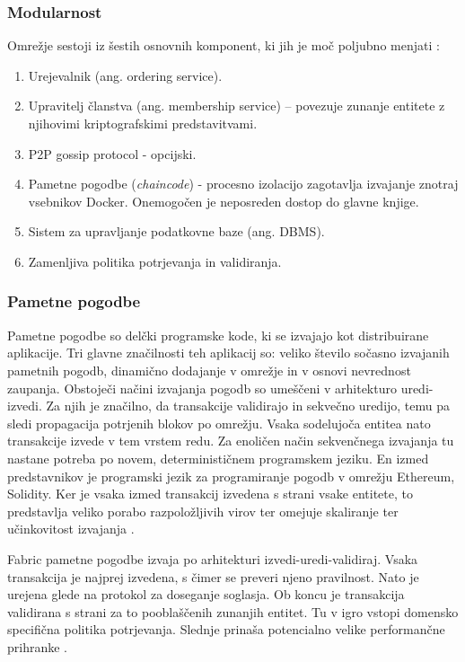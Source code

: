 \documentclass[a4paper, 12pt]{book}
\begin{document}
\subsubsection{Modularnost}
Omrežje sestoji iz šestih osnovnih komponent, ki jih je moč poljubno menjati \cite{hyperledgerDocs}:
\begin{enumerate}
	\item Urejevalnik (ang. ordering service).
	\item Upravitelj članstva (ang. membership service) -- povezuje zunanje entitete z njihovimi kriptografskimi predstavitvami.
	\item P2P gossip protocol - opcijski.
	\item Pametne pogodbe (\textit{chaincode}) - procesno izolacijo zagotavlja izvajanje znotraj vsebnikov Docker. 
	Onemogočen je neposreden dostop do glavne knjige.
	\item Sistem za upravljanje podatkovne baze (ang. DBMS).
	\item Zamenljiva politika potrjevanja in validiranja.
\end{enumerate}

\subsubsection{Pametne pogodbe}
Pametne pogodbe so delčki programske kode, ki se izvajajo kot distribuirane aplikacije.
Tri glavne značilnosti teh aplikacij so: veliko število sočasno izvajanih pametnih pogodb, dinamično dodajanje v omrežje in v osnovi nevrednost zaupanja.
Obstoječi načini izvajanja pogodb so umeščeni v arhitekturo uredi-izvedi.
Za njih je značilno, da transakcije validirajo in sekvečno uredijo, temu pa sledi propagacija potrjenih blokov po omrežju.
Vsaka sodelujoča entitea nato transakcije izvede v tem vrstem redu.
Za enoličen način sekvenčnega izvajanja tu nastane potreba po novem, determinističnem programskem jeziku.
En izmed predstavnikov je programski jezik za programiranje pogodb v omrežju Ethereum, Solidity.
Ker je vsaka izmed transakcij izvedena s strani vsake entitete, to predstavlja veliko porabo razpoložljivih virov ter omejuje skaliranje ter učinkovitost izvajanja \cite{hyperledgerDocs}.

Fabric pametne pogodbe izvaja po arhitekturi izvedi-uredi-validiraj.
Vsaka transakcija je najprej izvedena, s čimer se preveri njeno pravilnost.
Nato je urejena glede na protokol za doseganje soglasja.
Ob koncu je transakcija validirana s strani za to pooblaščenih zunanjih entitet.
Tu v igro vstopi domensko specifična politika potrjevanja.
Slednje prinaša potencialno velike performančne prihranke \cite{hyperledgerDocs}.
\end{document}
